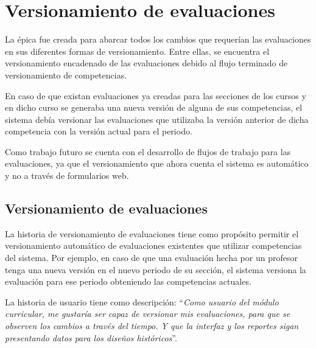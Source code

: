 \section{Versionamiento de evaluaciones}
La épica fue creada para abarcar todos los cambios que requerían las evaluaciones en sus diferentes formas de versionamiento. Entre ellas, se encuentra el versionamiento encadenado de las evaluaciones debido al flujo terminado de versionamiento de competencias. 

En caso de que existan evaluaciones ya creadas para las secciones de los cursos y en dicho curso se generaba una nueva versión de alguna de sus competencias, el sistema debía versionar las evaluaciones que utilizaba la versión anterior de dicha competencia con la versión actual para el periodo.

Como trabajo futuro se cuenta con el desarrollo de flujos de trabajo para las evaluaciones, ya que el versionamiento que ahora cuenta el sistema es automático y no a través de formularios web.

\begin{table}[H]
\centering
{}
\caption{Historias de usuario para el versionamiento encadenado de evaluaciones debido al versionamiento de competencias}
\label{epic:5}
\end{table}

\subsection{Versionamiento de evaluaciones} \label{versionamiento_encadenado}
La historia de versionamiento de evaluaciones tiene como propósito permitir el versionamiento automático de evaluaciones existentes que utilizar competencias del sistema. Por ejemplo, en caso de que una evaluación hecha por un profesor tenga una nueva versión en el nuevo periodo de su sección, el sistema versiona la evaluación para ese periodo obteniendo las competencias actuales.

La historia de usuario tiene como descripción: \enquote{\textit{Como usuario del módulo curricular, me gustaría ser capaz de versionar mis evaluaciones, para que se observen los cambios a través del tiempo. Y que la interfaz y los reportes sigan presentando datos para los diseños históricos}}.

